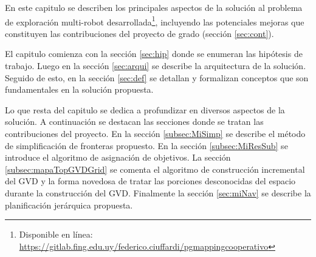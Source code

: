 En este capitulo se describen los principales aspectos de la solución al
problema de exploración multi-robot desarrollada\footnote{Disponible en
línea:\\
\url{https://gitlab.fing.edu.uy/federico.ciuffardi/pgmappingcooperativo}},
incluyendo las potenciales mejoras que constituyen las contribuciones del
proyecto de grado (sección \ref{sec:cont}).

El capitulo comienza con la sección \ref{sec:hip} donde se enumeran las
hipótesis de trabajo. Luego en la sección \ref{sec:arqui} se describe la
arquitectura de la solución. Seguido de esto, en la sección \ref{sec:def} se
detallan y formalizan conceptos que son fundamentales en la solución propuesta.

Lo que resta del capitulo se dedica a profundizar en diversos aspectos de la
solución. A continuación se destacan las secciones donde se tratan las
contribuciones del proyecto. En la sección \ref{subsec:MiSimp} se describe el
método de simplificación de fronteras propuesto. En la sección
\ref{subsec:MiResSub} se introduce el algoritmo de asignación de objetivos. La sección
\ref{subsec:mapaTopGVDGrid} se comenta el algoritmo de
construcción incremental del GVD y la forma novedosa de tratar
las porciones desconocidas del espacio durante la construcción del GVD.
Finalmente la sección \ref{sec:miNav} se describe la planificación jerárquica
propuesta.




